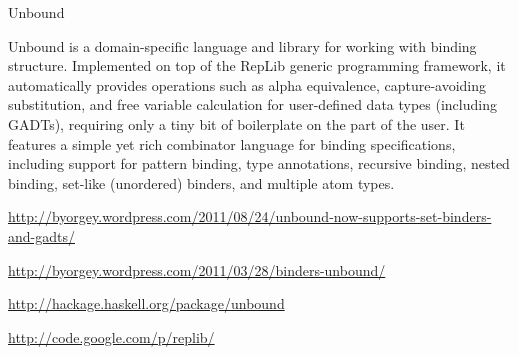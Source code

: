 \begin{hcarentry}[updated]{Unbound}
\makeheader

Unbound is a domain-specific language and library for working with
binding structure.  Implemented on top of the RepLib generic
programming framework, it automatically provides operations such as
alpha equivalence, capture-avoiding substitution, and free variable
calculation for user-defined data types (including GADTs), requiring
only a tiny bit of boilerplate on the part of the user.  It features a
simple yet rich combinator language for binding specifications,
including support for pattern binding, type annotations, recursive
binding, nested binding, set-like (unordered) binders, and multiple
atom types.

\FurtherReading
\begin{compactitem}
\item \url{http://byorgey.wordpress.com/2011/08/24/unbound-now-supports-set-binders-and-gadts/}
\item \url{http://byorgey.wordpress.com/2011/03/28/binders-unbound/}
\item \url{http://hackage.haskell.org/package/unbound}
\item \url{http://code.google.com/p/replib/}
\end{compactitem}
\end{hcarentry}
